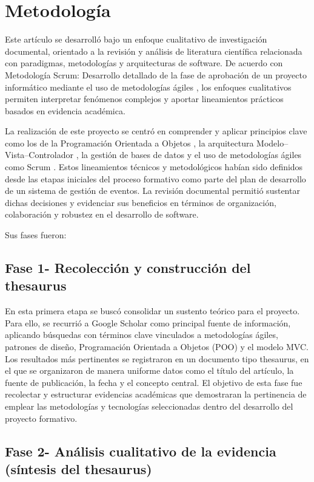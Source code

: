 \section{Metodología}

Este artículo se desarrolló bajo un enfoque cualitativo de investigación documental, orientado a la revisión y análisis de literatura científica relacionada con paradigmas, metodologías y arquitecturas de software. De acuerdo con Metodología Scrum: Desarrollo detallado de la fase de aprobación de un proyecto informático mediante el uso de metodologías ágiles \cite{scrum}, los enfoques cualitativos permiten interpretar fenómenos complejos y aportar lineamientos prácticos basados en evidencia académica.

La realización de este proyecto se centró en comprender y aplicar principios clave como los de la Programación Orientada a Objetos \cite{poo}, la arquitectura Modelo–Vista–Controlador \cite{mvc}, la gestión de bases de datos \cite{databases} y el uso de metodologías ágiles como Scrum \cite{scrum}. Estos lineamientos técnicos y metodológicos habían sido definidos desde las etapas iniciales del proceso formativo como parte del plan de desarrollo de un sistema de gestión de eventos. La revisión documental permitió sustentar dichas decisiones y evidenciar sus beneficios en términos de organización, colaboración y robustez en el desarrollo de software.

Sus fases fueron:

\subsection{Fase 1- Recolección y construcción del thesaurus}

En esta primera etapa se buscó consolidar un sustento teórico para el proyecto. Para ello, se recurrió a Google Scholar como principal fuente de información, aplicando búsquedas con términos clave vinculados a metodologías ágiles, patrones de diseño, Programación Orientada a Objetos (POO) y el modelo MVC. Los resultados más pertinentes se registraron en un documento tipo thesaurus, en el que se organizaron de manera uniforme datos como el título del artículo, la fuente de publicación, la fecha y el concepto central. El objetivo de esta fase fue recolectar y estructurar evidencias académicas que demostraran la pertinencia de emplear las metodologías y tecnologías seleccionadas dentro del desarrollo del proyecto formativo.

\subsection{Fase 2- Análisis cualitativo de la evidencia (síntesis del thesaurus)}

